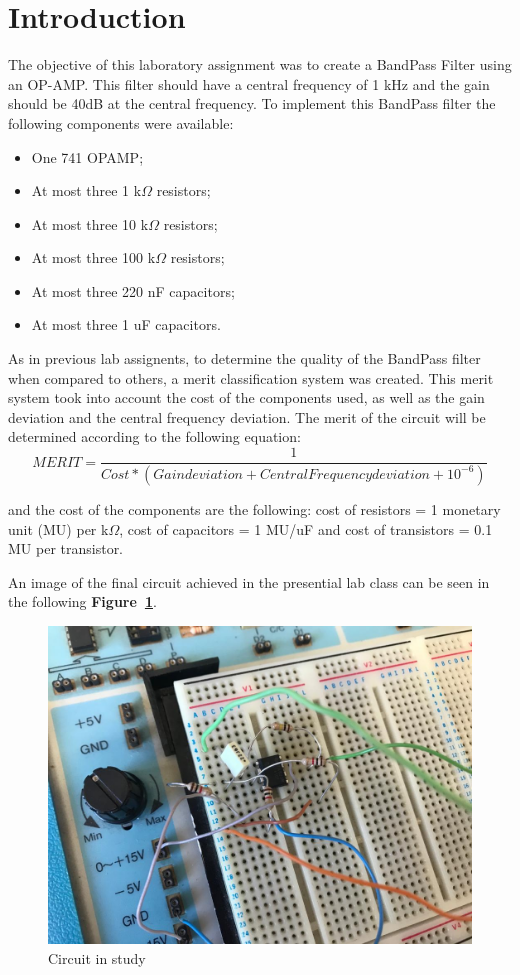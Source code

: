 \section{Introduction}
\label{sec:introduction}


\par The objective of this laboratory assignment was to create a BandPass Filter using an OP-AMP. This filter should have a central frequency of 1 kHz and the gain should be 40dB at the central frequency. To implement this BandPass filter the following components were available: 
\begin{itemize}

\item One 741 OPAMP;
\item At most three 1 k$\Omega$ resistors;
\item At most three 10 k$\Omega$ resistors;
\item At most three 100 k$\Omega$ resistors;
\item At most three 220 nF capacitors;
\item At most three 1 uF capacitors.

\end{itemize} 


\par   
As in previous lab assignents, to determine the quality of the BandPass filter when compared to others, a merit classification system was created. This merit system took into account the cost of the components used, as well as the gain deviation and the central frequency deviation. The merit of the circuit will be determined according to the following equation: 
\begin {equation}
	 MERIT = \frac{1}{Cost*(Gain deviation + Central Frequency deviation + 10^{-6})  }   	
	\label{eq:i1}
\end{equation}

and the cost of the components are the following: cost of resistors = 1 monetary unit (MU) per k$\Omega$, cost of capacitors = 1 MU/uF
and cost of transistors = 0.1 MU per transistor. 

An image of the final circuit achieved in the presential lab class can be seen in the following \textbf{Figure~\ref{fig:circuit_t5}}.\par
\begin{figure}[h] \centering
\includegraphics[width=0.6\linewidth]{circuit_t5.jpg}
\caption{Circuit in study}
\label{fig:circuit_t5}
\end{figure}


